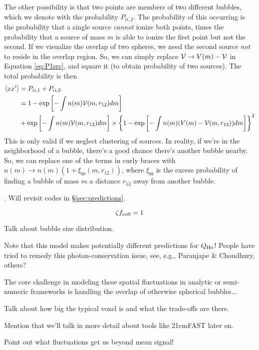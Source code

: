 The other possibility is that two points are members of two different bubbles, which we denote with the probability $P_{ii,2}$. The probability of this occurring is the probability that a single source \textit{cannot} ionize both points, times the probability that a source of mass $m$ is able to ionize the first point but not the second. If we visualize the overlap of two spheres, we need the second source \textit{not} to reside in the overlap region. So, we can simply replace $\mathcal{V} \rightarrow V(m) - \mathcal{V}$ in Equation \ref{eq:P1src}, and square it (to obtain probability of two sources). The total probability is then
\begin{align}
    \langle x x^{\prime} \rangle & = P_{ii,1} + P_{ii,2} \nonumber \\
    & = 1 - \exp \left[- \int n(m) \mathcal{V}(m,r_{12}) dm \right] \nonumber \\
    & + \exp \left[- \int n(m) \mathcal{V}(m,r_{12}) dm \right] \times \left\{1 - \exp \left[- \int n(m) (V(m) - \mathcal{V}(m,r_{12})) dm \right] \right\}^2
\end{align}
This is only valid if we neglect clustering of sources. In reality, if we're in the neighborhood of a bubble, there's a good chance there's another bubble nearby. So, we can replace one of the terms in curly braces with $n(m) \rightarrow n(m) (1 + \xi_{bb}(m, r_{12}))$, where $\xi_{bb}$ is the excess probability of finding a bubble of mass $m$ a distance $r_{12}$ away from another bubble. 




\cite{Furlanetto2004}. Will revisit codes in \S\ref{sec:predictions}.

\begin{equation}
	\zeta f_{\text{coll}} = 1
\end{equation}


{\color{red} Talk about bubble size distribution.}

Note that this model makes potentially different predictions for $Q_{\text{H} {\textsc{ii}}}$! People have tried to remedy this photon-conservation issue, see, e.g., Paranjape \& Choudhury, others?


The core challenge in modeling these spatial fluctuations in analytic or semi-numeric frameworks is handling the overlap of otherwise spherical bubbles...


Talk about how big the typical voxel is and what the trade-offs are there.


Mention that we'll talk in more detail about tools like 21cmFAST later on.

Point out what fluctuations get us beyond mean signal!



